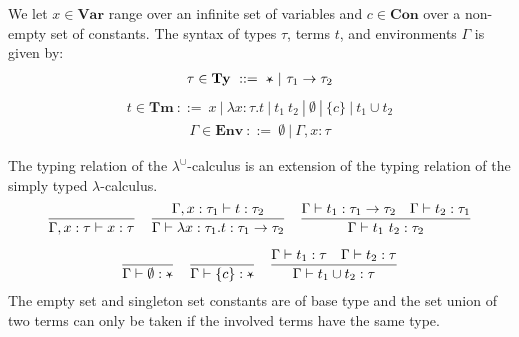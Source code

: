 \documentclass{llncs}
\newcommand{\VER}{\\[1.5ex]}
\newcommand{\RulX}[3]{\frac{#2}{#3}}
\newcommand{\EmptyEnv}{\emptyset}
\newcommand{\LambdaUnion}{\lambda^\cup}
\newcommand{\ClassLuEnv}{\mathbf{Env}}
\newcommand{\ClassLuTm}{\mathbf{Tm}}
\newcommand{\ClassLuTy}{\mathbf{Ty}}
\newcommand{\LuAbs}[3]{\lambda #1 : #2. #3}
\newcommand{\LuApp}[2]{#1\ #2}
\newcommand{\LuArr}[2]{{#1 \to #2}}
\newcommand{\LuBase}{\text{\rotatebox[origin=c]{180}{$\star$}}}
\newcommand{\LuCON}{c}
\newcommand{\LuCon}[1][\LuCON]{\{#1\}}
\newcommand{\LuEmpty}{\emptyset}
\newcommand{\LuEnv}{\Gamma}
\newcommand{\LuTm}{t}
\newcommand{\LuTy}{\tau}
\newcommand{\LuUnion}[2]{#1 \cup #2}
\newcommand{\LuVar}{x}
\newcommand{\JudgeLuTy}[3][\LuEnv]{#1 \vdash #2 : #3}
\newcommand{\ClassVar}{\mathbf{Var}}
\newcommand{\ClassCon}{\mathbf{Con}}
\begin{document}
We let $\LuVar \in \ClassVar$ range over an infinite set of variables and $c \in \ClassCon$ over a non-empty set of constants. The syntax of types $\LuTy$, terms $\LuTm$, and environments $\LuEnv$ is given by:
\begin{align*}
    \LuTy \in \ClassLuTy \ ::=\ \LuBase \ |\  \LuArr{\LuTy_1}{\LuTy_2}
\end{align*}
\begin{align*}
    \LuTm \in \ClassLuTm \ ::=\    \LuVar
                         \ |\   \LuAbs{\LuVar}{\LuTy}{\LuTm}
                         \ |\   \LuApp{\LuTm_1}{\LuTm_2}
                         \ |\   \LuEmpty
                         \ |\   \LuCon
                         \ |\   \LuUnion{\LuTm_1}{\LuTm_2}
\end{align*}
\begin{align*}
    \LuEnv \in \ClassLuEnv\ ::=\ \EmptyEnv \ | \ \LuEnv, \LuVar : \LuTy
\end{align*}


The typing relation of the $\LambdaUnion$-calculus is an extension of the typing relation of the simply typed $\lambda$-calculus.
\begin{gather*}
    \RulX{T-Var}
         {}
         {\JudgeLuTy[\LuEnv, \LuVar : \LuTy]{\LuVar}{\LuTy}}
    \quad
    \RulX{T-Abs}
         {\JudgeLuTy[\LuEnv, \LuVar : \LuTy_1]{\LuTm}{\LuTy_2}}
         {\JudgeLuTy{\LuAbs{\LuVar}{\LuTy_1}{\LuTm}}{\LuArr{\LuTy_1}{\LuTy_2}}}
    \quad
    \RulX{T-App}
         {\JudgeLuTy{\LuTm_1}{\LuArr{\LuTy_1}{\LuTy_2}} \quad \JudgeLuTy{\LuTm_2}{\LuTy_1}}
         {\JudgeLuTy{\LuApp{\LuTm_1}{\LuTm_2}}{\LuTy_2}}
    \VER
    \RulX{T-Empty}
         {}
         {\JudgeLuTy{\LuEmpty}{\LuBase}}
    \quad
    \RulX{T-Con}
         {}
         {\JudgeLuTy{\LuCon}{\LuBase}}
    \quad
    \RulX{T-Union}
         {\JudgeLuTy{\LuTm_1}{\LuTy} \quad \JudgeLuTy{\LuTm_2}{\LuTy}}
         {\JudgeLuTy{\LuUnion{\LuTm_1}{\LuTm_2}}{\LuTy}}
\end{gather*}
The empty set and singleton set constants are of base type and the set union of two terms can only be taken if the involved terms have the same type.
\end{document}
